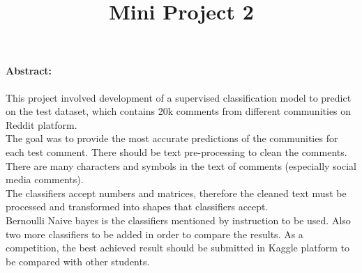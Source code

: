 \documentclass[12pt]{report}
\begin{document}
	\title{Mini Project 2}
	
	
	\paragraph{Abstract:}
	This project involved development of a supervised classification model to predict on the test dataset, which contains 20k comments from different communities on Reddit platform.\\
	The goal was to provide the most accurate predictions of the communities for each test comment.
	There should be text pre-processing to clean the comments. There are many characters and symbols in the text of comments (especially  social media comments).\\
	The classifiers accept numbers and matrices, therefore the cleaned text must be processed and transformed into shapes that classifiers accept. \\
	Bernoulli Naive bayes is the classifiers mentioned by instruction to be used.
	Also two more classifiers to be added in order to compare the results.  
	As a competition, the best achieved result should be submitted in Kaggle platform to be compared with other students. 
	
	
	
\end{document}
